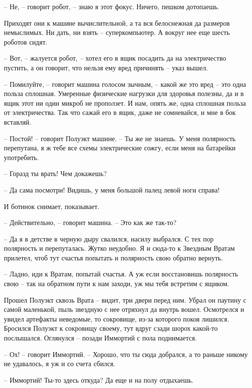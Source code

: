 \documentclass[ebook,oneside,final,openright]{memoir}
\begin{document}
– Не, – говорит робот, – знаю я этот фокус. Ничего, пешком дотопаешь.\par
\par
Приходят они к машине вычислительной, а та вся белоснежная да размеров немыслимых. Ни дать, ни взять – суперкомпьютер. А вокруг нее еще шесть роботов сидят. \par
– Вот, – жалуется робот, – хотел его в ящик посадить да на электричество пустить, а он говорит, что нельзя ему вред причинять – указ вышел. \par
– Помилуйте, – говорит машина голосом зычным, – какой же это вред – это одна польза сплошная. Умеренные физические нагрузки для здоровья полезны, да и в ящик этот ни один микроб не проползет. И нам, опять же, одна сплошная польза от электричества. Так что сажай его в ящик, даже не сомневайся, и мне в бок вставляй. \par
– Постой! – говорит Полуэкт машине. – Ты же не знаешь. У меня полярность перепутана, я ж тебе все схемы электрические сожгу, если меня на батарейки употребить. \par
– Горазд ты врать! Чем докажешь? \par
– Да сама посмотри! Видишь, у меня большой палец левой ноги справа! \par
И ботинок снимает, показывает. \par
– Действительно, – говорит машина. – Это как же так-то? \par
– Да я в детстве в черную дыру свалился, насилу выбрался. С тех пор полярность и перепуталась. Жутко неудобно. Я и сюда-то к Звездным Вратам прилетел, чтоб тут счастья попытать и полярность свою обратно вернуть. \par
– Ладно, иди к Вратам, попытай счастья. А уж если восстановишь полярность свою – так на обратном пути к нам заходи, уж мы тебя встретим с ящиком.\par
\par
Прошел Полуэкт сквозь Врата – видит, три двери перед ним. Убрал он паутину с самой маленькой, пыль звездную с нее отряхнул да внутрь вошел. Осмотрелся и увидел артефакты неведомые, то сокровище, из-за которого покоя лишился. Бросился Полуэкт к сокровищу своему, тут вдруг сзади шорох какой-то послышался. Оглянулся – позади Иммортий с пола поднимается.\par
– Ох! – говорит Иммортий. – Хорошо, что ты сюда добрался, а то раньше никому не удавалось, я уж и со счета сбился.\par
– Иммортий! Ты-то здесь откуда? Да еще и на полу отдыхаешь.\par
\end{document}
